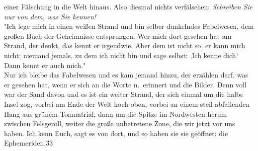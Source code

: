 \documentclass[
]{article}
\begin{document}
einer Fälschung in die Welt hinaus. Also diesmal nichts verfälschen:
\emph{Schreiben Sie nur von dem, was Sie kennen!}\\
"Ich lege mich in einen weißen Strand und bin selber dunkelndes
Fabelwesen, dem großen Buch der Geheimnisse entsprungen. Wer mich dort
gesehen hat am Strand, der denkt, das kennt er irgendwie. Aber dem ist
nicht so, er kann mich nicht; niemand jemals, zu dem ich nicht hin und
sage selbst: ,Ich kenne dich.` Dann kennt er auch mich."\\
Nur ich bleibe das Fabelwesen und es kam jemand hinzu, der erzählen
darf, was er gesehen hat, wenn er sich an die Worte n.~erinnert und die
Bilder. Denn voll war der Sand davon und es ist ein weiter Strand, der
sich einmal um die halbe Insel zog, vorbei am Ende der Welt hoch oben,
vorbei an einem steil abfallenden Hang aus grünem Tonmatrial, dann um
die Spitze im Nordwesten herum zwischen Felsgeröll, weiter die große
unbetretene Zone, die wir jetzt vor uns haben. Ich kenn Euch, sagt es
von dort, und so haben sie sie geöffnet: die Ephemeriden.33
\end{document}
